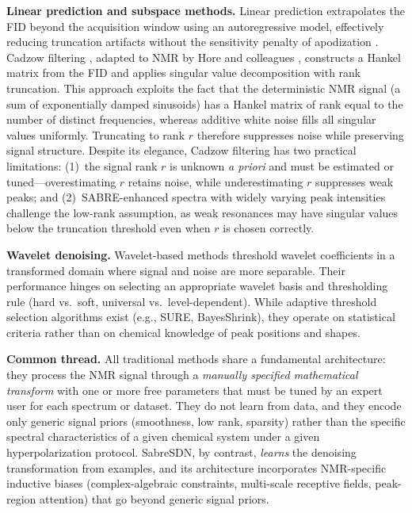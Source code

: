 \textbf{Linear prediction and subspace methods.}
Linear prediction extrapolates the FID beyond the acquisition window using
an autoregressive model, effectively reducing truncation artifacts without
the sensitivity penalty of apodization \cite{Barkhuijsen1985, Koehl1994}.
Cadzow filtering \cite{Cadzow1988}, adapted to NMR by Hore and colleagues
\cite{Hore2013}, constructs a Hankel matrix from the FID and applies
singular value decomposition with rank truncation. This approach exploits
the fact that the deterministic NMR signal (a sum of exponentially damped
sinusoids) has a Hankel matrix of rank equal to the number of distinct
frequencies, whereas additive white noise fills all singular values uniformly.
Truncating to rank $r$ therefore suppresses noise while preserving signal
structure. Despite its elegance, Cadzow filtering has two practical
limitations: (1)~the signal rank $r$ is unknown \emph{a priori} and must
be estimated or tuned---overestimating $r$ retains noise, while
underestimating $r$ suppresses weak peaks; and (2)~SABRE-enhanced spectra
with widely varying peak intensities challenge the low-rank assumption,
as weak resonances may have singular values below the truncation threshold
even when $r$ is chosen correctly.

\textbf{Wavelet denoising.}
Wavelet-based methods \cite{Antonijevic2006, Gomez2016} threshold wavelet
coefficients in a transformed domain where signal and noise are more
separable. Their performance hinges on selecting an appropriate wavelet
basis and thresholding rule (hard vs.\ soft, universal vs.\ level-dependent).
While adaptive threshold selection algorithms exist (e.g., SURE, BayesShrink),
they operate on statistical criteria rather than on chemical knowledge of
peak positions and shapes.

\textbf{Common thread.}
All traditional methods share a fundamental architecture: they process
the NMR signal through a \emph{manually specified mathematical transform}
with one or more free parameters that must be tuned by an expert user for
each spectrum or dataset. They do not learn from data, and they encode
only generic signal priors (smoothness, low rank, sparsity) rather than
the specific spectral characteristics of a given chemical system under a
given hyperpolarization protocol. SabreSDN, by contrast, \emph{learns} the
denoising transformation from examples, and its architecture incorporates
NMR-specific inductive biases (complex-algebraic constraints, multi-scale
receptive fields, peak-region attention) that go beyond generic signal
priors.

